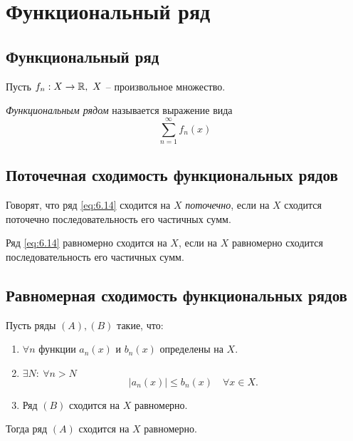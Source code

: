 \section{Функциональный ряд}

\setcounter{subsection}{49}

\subsection{Функциональный ряд}

\begin{definition}
    Пусть $f_n: X \rightarrow\mathbb{R}, \ X$ -- произвольное множество.

    \emph{Функциональным рядом} называется выражение вида
    \begin{equation}\label{eq:6.14}
        \sum_{n=1}^{\infty}f_n(x)
    \end{equation}
\end{definition}

\newpage

\subsection{Поточечная сходимость функциональных рядов}

\begin{note}
    Говорят, что ряд \ref{eq:6.14} сходится на $X$ \emph{поточечно}, если на $X$ сходится поточечно последовательность его частичных сумм.
    
    Ряд \ref{eq:6.14} {равномерно} сходится на $X$, если на $X$ равномерно сходится последовательность его частичных сумм.
\end{note}

\subsection{Равномерная сходимость функциональных рядов}

\begin{theorem}
    Пусть ряды $ (A),(B) $ такие, что:
    \begin{enumerate}
        \item $\forall n$ функции $a_n(x)$ и $b_n(x)$ определены на $X$.
        \item $\exists N: \ \forall n > N$
              \[
                  \big|a_n(x)\big| \leqslant b_n(x) \quad \forall x \in X.
              \]
        \item Ряд $(B)$ сходится на $X$ равномерно.
    \end{enumerate}

    Тогда ряд $(A)$ сходится на $X$ равномерно.
\end{theorem}

